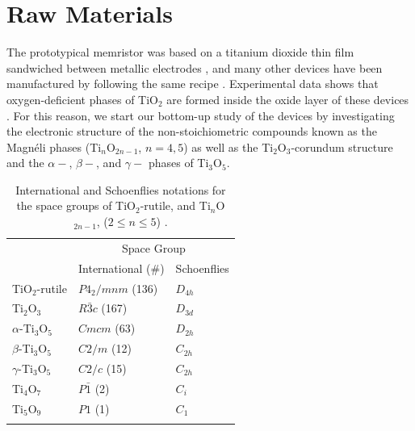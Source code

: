 \chapter{Raw Materials}
\label{chap:raw}

The prototypical memristor was based on a titanium dioxide thin film sandwiched between metallic electrodes \cite{Williams2008}, and many other devices have been manufactured by following the same recipe \cite{Szot2011,Kwon2010,Jeong2012,Pan2014}. Experimental data shows that oxygen-deficient phases of TiO$_2$ are formed inside the oxide layer of these devices \cite{Kwon2010,HwanKim2011}. For this reason, we start our bottom-up study of the devices by investigating the electronic structure of the non-stoichiometric compounds known as the Magnéli phases (Ti$_n$O$_{2n-1}$, $n = 4, 5$) as well as the Ti$_2$O$_3$-corundum structure and the $\alpha-$, $\beta-$, and $\gamma-$ phases of Ti$_3$O$_5$. 

\begin{center}
 \begin{table}[h!]
  \centering
   \caption{\label{tab:symm} International and Schoenflies notations for the space groups of TiO$_2$-rutile, and Ti${}_n$O${}_{2n-1}$, ($2 \leq n \leq 5$) \cite{Belsky2002,Aroyo2006}.}
   \begin{tabular}{p{}p{}p{}} 
   \hhline{===}
                              & \multicolumn{2}{c}{Space Group}    \\
                              & International (\#) &  Schoenflies  \\
    \hline
    TiO$_2$-rutile			  & $P4_2/mnm$ (136)   & $D_{4h}$      \\
    Ti${}_2$O${}_3$           & $R\bar{3}c$ (167)  & $D_{3d}$      \\
    $\alpha$-Ti${}_3$O${}_5$  & $Cmcm$ (63)        & $D_{2h}$      \\
    $\beta$-Ti${}_3$O${}_5$   & $C2/m$ (12)        & $C_{2h}$      \\
    $\gamma$-Ti${}_3$O${}_5$  & $C2/c$ (15)        & $C_{2h}$      \\
    Ti${}_4$O${}_7$           & $P\bar{1}$ (2)     & $C_i$         \\
    Ti${}_5$O${}_9$           & $P1$ (1)           & $C_1$  \\ 
    \hhline{===}
   \end{tabular}
 \end{table}
\end{center}


